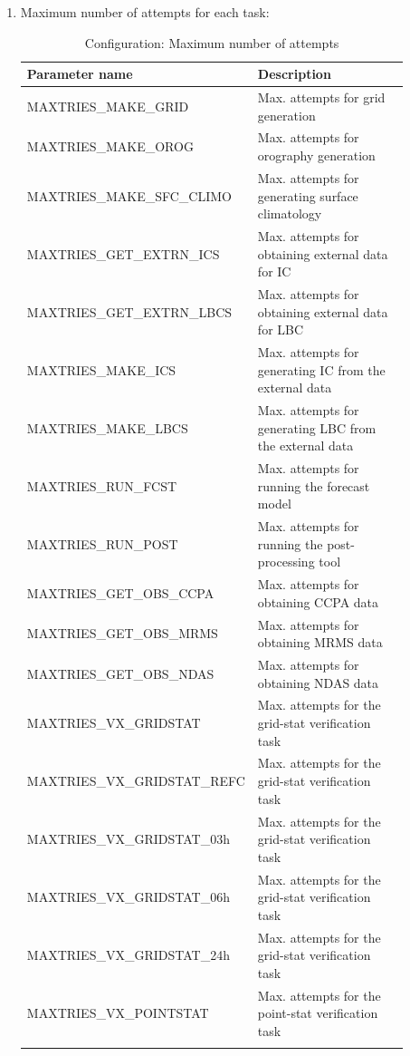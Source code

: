\documentclass[11pt,fleqn]{report}              %
\begin{document}
\begin{enumerate}
\item Maximum number of attempts for each task:
{
\scriptsize
\begin{longtable}{p{0.34\linewidth} | p{0.54\linewidth} }
\hline
\hline
Parameter name & Description \\
\hline
MAXTRIES\_MAKE\_GRID & Max. attempts for grid generation \\
MAXTRIES\_MAKE\_OROG & Max. attempts for orography generation \\
MAXTRIES\_MAKE\_SFC\_CLIMO & Max. attempts for generating surface climatology \\
MAXTRIES\_GET\_EXTRN\_ICS & Max. attempts for obtaining external data for IC \\
MAXTRIES\_GET\_EXTRN\_LBCS & Max. attempts for obtaining external data for LBC \\
MAXTRIES\_MAKE\_ICS & Max. attempts for generating IC from the external data \\
MAXTRIES\_MAKE\_LBCS & Max. attempts for generating LBC from the external data \\
MAXTRIES\_RUN\_FCST & Max. attempts for running the forecast model \\
MAXTRIES\_RUN\_POST & Max. attempts for running the post-processing tool \\
MAXTRIES\_GET\_OBS\_CCPA & Max. attempts for obtaining CCPA data  \\
MAXTRIES\_GET\_OBS\_MRMS & Max. attempts for obtaining MRMS data  \\
MAXTRIES\_GET\_OBS\_NDAS & Max. attempts for obtaining NDAS data \\
MAXTRIES\_VX\_GRIDSTAT & Max. attempts for the grid-stat verification task \\
MAXTRIES\_VX\_GRIDSTAT\_REFC & Max. attempts for the grid-stat verification task \\
MAXTRIES\_VX\_GRIDSTAT\_03h & Max. attempts for the grid-stat verification task \\
MAXTRIES\_VX\_GRIDSTAT\_06h & Max. attempts for the grid-stat verification task \\
MAXTRIES\_VX\_GRIDSTAT\_24h & Max. attempts for the grid-stat verification task \\
MAXTRIES\_VX\_POINTSTAT & Max. attempts for the point-stat verification task \\
\hline
\caption{Configuration: Maximum number of attempts}
\label{table:config_maxtries}
\end{longtable}
}


\end{enumerate}
\end{document}
